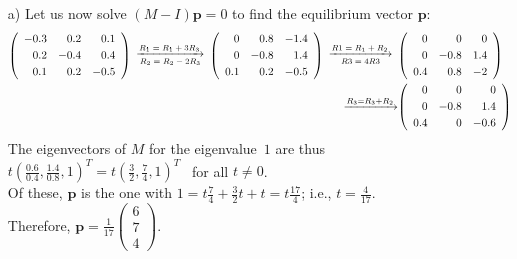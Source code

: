 \documentclass[11pt]{article}
\renewcommand{\vec}[1]{\mathbf{#1}}
\newcommand{\vc}[1]{\begin{pmatrix}#1\end{pmatrix}}
\newcommand{\tmat}[1]{{\left(\begin{array}{rrr}#1\end{array}\right)}}
\newcommand{\ra}[1]{\xrightarrow{#1}}
\newcommand{\dra}[2]{\begin{array}{c}\xrightarrow{\text{\scriptsize$#1$}}\\[-2mm]{\text{\scriptsize$#2$}}\end{array}}
\begin{document}
\newpage{}
\begin{itemize}
  \item[{a)}]
    Let us now solve $(M-I)\vec{p} = 0$ to find the equilibrium vector $\vec{p}$:
   \begin{align*}
    \tmat{-0.3 &  0.2 &  0.1\\[1mm]
           0.2 & -0.4 &  0.4\\[1mm]
           0.1 &  0.2 & -0.5}
    \dra{R_1 = R_1 + 3R_3}{R_2 = R_2 - 2R_3}
    \tmat{ 0   &  0.8 & -1.4\\[1mm]
           0   & -0.8 &  1.4\\[1mm]
           0.1 &  0.2 & -0.5}
    \dra{R1 = R_1 + R_2}{R3 = 4R3}
   &\tmat{ 0   &  0   &  0\\[1mm]
           0   & -0.8 &  1.4\\[1mm]
           0.4 &  0.8 & -2  }\\
    \ra{R_3 = R_3 + R_2}
   &\tmat{ 0   &  0   &  0\\[1mm]
           0   & -0.8 &  1.4\\[1mm]
           0.4 &  0   & -0.6}
   \end{align*}
   The eigenvectors of $M$ for the eigenvalue~$1$ are thus \, $t(\frac{0.6}{0.4},\frac{1.4}{0.8},1)^T = t(\frac{3}{2},\frac{7}{4},1)^T$ \, for all $t\neq 0$.
   \\Of these, $\vec{p}$ is the one with $1 = t\frac{7}{4} + \frac{3}{2}t + t = t\frac{17}{4}$;
    i.e., $t = \frac{4}{17}$.
   \\Therefore, $\vec{p} = \frac{1}{17}\vc{6\\7\\4}$.


\end{itemize}
\end{document}
